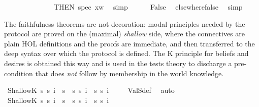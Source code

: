 \begin{isabellebody}
\ \ \ \ \ \ \ \ \ \ \ \ \ \ THEN\ spec{\isacharbrackleft}{\kern0pt}\ x{\isacharequal}{\kern0pt}w\ \isamarkupfalse%
\ simp\isanewline
\ \ \ \ \isamarkupfalse%
\ False\ \isamarkupfalse%
\ elsewhere{\isacharunderscore}{\kern0pt}false\ \isamarkupfalse%
\ simp\isanewline
\ \ \isamarkupfalse%
\isanewline
{}\isamarkupfalse%
%
\endisatagproof
{\isafoldproof}%
%
\isadelimproof
%
\endisadelimproof
%
\isadelimdocument
%
\endisadelimdocument
%
\isatagdocument
%
\isamarkuptrue%
%
\endisatagdocument
{\isafolddocument}%
%
\isadelimdocument
%
\endisadelimdocument
%
\begin{isamarkuptext}%
The faithfulness theorems are not decoration: modal principles needed by the
protocol are proved on the (maximal) \emph{shallow} side, where the connectives are plain
HOL definitions and the proofs are immediate, and then transferred to the deep
syntax over which the protocol is defined. The K principle for beliefs and desires
is obtained this way and is used in the tests theory to discharge a pre-condition
that does \emph{not} follow by membership in the world knowledge.%
\end{isamarkuptext}\isamarkuptrue%
\isamarkupfalse%
\ ShallowK{\isasymB}{\isacharcolon}{\kern0pt}\ {\isachardoublequoteopen}{\isasymTurnstile}\isactrlsup s\ {\isacharparenleft}{\kern0pt}{\isasymB}\isactrlsup s\ i\ {\isacharparenleft}{\kern0pt}{\isasymphi}\ {\isasymsupset}\isactrlsup s\ {\isasympsi}{\isacharparenright}{\kern0pt}\ {\isasymsupset}\isactrlsup s\ {\isacharparenleft}{\kern0pt}{\isasymB}\isactrlsup s\ i\ {\isasymphi}\ {\isasymsupset}\isactrlsup s\ {\isasymB}\isactrlsup s\ i\ {\isasympsi}{\isacharparenright}{\kern0pt}{\isacharparenright}{\kern0pt}{\isachardoublequoteclose}\isanewline
%
\isadelimproof
\ \ %
\endisadelimproof
%
\isatagproof
{}\isamarkupfalse%
\ ValS{\isacharunderscore}{\kern0pt}def\ \isamarkupfalse%
\ auto%
\endisatagproof
{\isafoldproof}%
%
\isadelimproof
\isanewline
%
\endisadelimproof
{}\isamarkupfalse%
\ ShallowK{\isasymD}{\isacharcolon}{\kern0pt}\ {\isachardoublequoteopen}{\isasymTurnstile}\isactrlsup s\ {\isacharparenleft}{\kern0pt}{\isasymD}\isactrlsup s\ i\ {\isacharparenleft}{\kern0pt}{\isasymphi}\ {\isasymsupset}\isactrlsup s\ {\isasympsi}{\isacharparenright}{\kern0pt}\ {\isasymsupset}\isactrlsup s\ {\isacharparenleft}{\kern0pt}{\isasymD}\isactrlsup s\ i\ {\isasymphi}\ {\isasymsupset}\isactrlsup s\ {\isasymD}\isactrlsup s\ i\ {\isasympsi}{\isacharparenright}{\kern0pt}{\isacharparenright}{\kern0pt}{\isachardoublequoteclose}\isanewline

\end{isabellebody}
